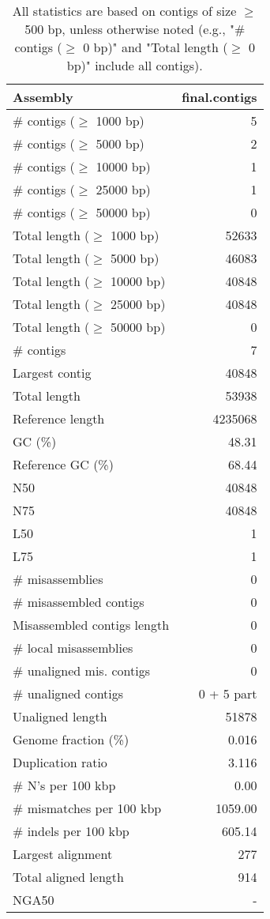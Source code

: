 \documentclass[12pt,a4paper]{article}
\begin{document}
\begin{table}[ht]
\begin{center}
\caption{All statistics are based on contigs of size $\geq$ 500 bp, unless otherwise noted (e.g., "\# contigs ($\geq$ 0 bp)" and "Total length ($\geq$ 0 bp)" include all contigs).}
\begin{tabular}{|l*{1}{|r}|}
\hline
Assembly & final.contigs \\ \hline
\# contigs ($\geq$ 1000 bp) & 5 \\ \hline
\# contigs ($\geq$ 5000 bp) & 2 \\ \hline
\# contigs ($\geq$ 10000 bp) & 1 \\ \hline
\# contigs ($\geq$ 25000 bp) & 1 \\ \hline
\# contigs ($\geq$ 50000 bp) & 0 \\ \hline
Total length ($\geq$ 1000 bp) & 52633 \\ \hline
Total length ($\geq$ 5000 bp) & 46083 \\ \hline
Total length ($\geq$ 10000 bp) & 40848 \\ \hline
Total length ($\geq$ 25000 bp) & 40848 \\ \hline
Total length ($\geq$ 50000 bp) & 0 \\ \hline
\# contigs & 7 \\ \hline
Largest contig & 40848 \\ \hline
Total length & 53938 \\ \hline
Reference length & 4235068 \\ \hline
GC (\%) & 48.31 \\ \hline
Reference GC (\%) & 68.44 \\ \hline
N50 & 40848 \\ \hline
N75 & 40848 \\ \hline
L50 & 1 \\ \hline
L75 & 1 \\ \hline
\# misassemblies & 0 \\ \hline
\# misassembled contigs & 0 \\ \hline
Misassembled contigs length & 0 \\ \hline
\# local misassemblies & 0 \\ \hline
\# unaligned mis. contigs & 0 \\ \hline
\# unaligned contigs & 0 + 5 part \\ \hline
Unaligned length & 51878 \\ \hline
Genome fraction (\%) & 0.016 \\ \hline
Duplication ratio & 3.116 \\ \hline
\# N's per 100 kbp & 0.00 \\ \hline
\# mismatches per 100 kbp & 1059.00 \\ \hline
\# indels per 100 kbp & 605.14 \\ \hline
Largest alignment & 277 \\ \hline
Total aligned length & 914 \\ \hline
NGA50 & - \\ \hline
\end{tabular}
\end{center}
\end{table}
\end{document}
